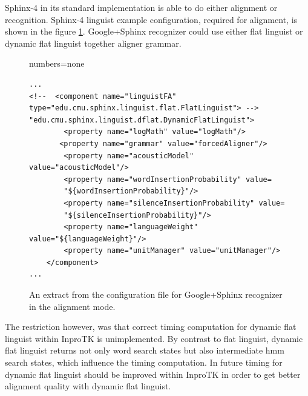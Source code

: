 Sphinx-4 in its standard implementation is able to do either alignment or
recognition. Sphinx-4 linguist example configuration, required for alignment, is
shown in the figure \ref{fig:conf_al}. 
Google+Sphinx recognizer could use either flat linguist or dynamic flat linguist
together aligner grammar. 

\begin{figure}[htbp]
  \centering 
 
{numbers=none}  
\lstset{language=XML} 
\begin{lstlisting}[frame=single]
...
<!--  <component name="linguistFA"
type="edu.cmu.sphinx.linguist.flat.FlatLinguist"> -->  
"edu.cmu.sphinx.linguist.dflat.DynamicFlatLinguist">  
        <property name="logMath" value="logMath"/>
       <property name="grammar" value="forcedAligner"/>   
        <property name="acousticModel" value="acousticModel"/>
        <property name="wordInsertionProbability" value=
        "${wordInsertionProbability}"/>
        <property name="silenceInsertionProbability" value=
        "${silenceInsertionProbability}"/>
        <property name="languageWeight" value="${languageWeight}"/>
        <property name="unitManager" value="unitManager"/>
    </component>
...
\end{lstlisting}
 \caption{An extract from the configuration file for Google+Sphinx recognizer in
 the alignment mode.}
  \label{fig:conf_al}
\end {figure}

The restriction however, was that correct timing
computation for dynamic flat linguist within InproTK is unimplemented. By
contrast to flat linguist, dynamic flat linguist returns not only   word search
states but also intermediate hmm search states, which influence the timing
computation.  In future timing for dynamic flat linguist should be improved
within InproTK in order to get better alignment quality with dynamic flat
linguist. 



